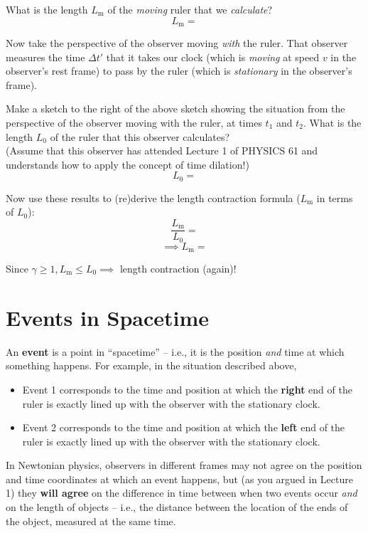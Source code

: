 \documentclass[11pt, letterpaper, openany]{book}
\newenvironment{exercise}[1][Exercise]{%
  \tcolorbox[blanker, breakable, left=1em,
    before skip=1em, after skip=1em,
    borderline west={3pt}{0pt}{PhysNavy},
    colback=PhysCream,
    before upper={\textcolor{PhysNavy}{\sffamily\bfseries #1:}\space}
  ]%
}{%
  \endtcolorbox%
}
\begin{document}
\begin{exercise}[Exercise 9]
What is the length $L_{\text{m}}$ of the \textit{moving} ruler that we \textit{calculate}?
\end{exercise}
\[ L_{\text{m}} = \]

Now take the perspective of the observer moving \textit{with} the ruler. That observer measures the time $\Delta t'$ that it takes our clock (which is \textit{moving} at speed $v$ in the observer's rest frame) to pass by the ruler (which is \textit{stationary} in the observer's frame).

\begin{exercise}[Exercise 10]
Make a sketch to the right of the above sketch showing the situation from the perspective of the observer moving with the ruler, at times $t_1$ and $t_2$. What is the length $L_0$ of the ruler that this observer calculates?\\
(Assume that this observer has attended Lecture 1 of PHYSICS 61 and understands how to apply the concept of time dilation!)
\end{exercise}
\[ L_0 = \]

\begin{exercise}[Exercise 11]
Now use these results to (re)derive the length contraction formula ($L_{\text{m}}$ in terms of $L_0$):
\end{exercise}
\[ \frac{L_{\text{m}}}{L_0} = \]
\[ \implies L_{\text{m}} = \]

Since $\gamma \ge 1, L_{\text{m}} \le L_0 \implies$ length contraction (again)!

\section{Events in Spacetime}

An \textbf{event} is a point in ``spacetime'' -- i.e., it is the position \textit{and} time at which something happens. For example, in the situation described above,
\begin{itemize}
    \item Event 1 corresponds to the time and position at which the \textbf{right} end of the ruler is exactly lined up with the observer with the stationary clock.
    \item Event 2 corresponds to the time and position at which the \textbf{left} end of the ruler is exactly lined up with the observer with the stationary clock.
\end{itemize}

In Newtonian physics, observers in different frames may not agree on the position and time coordinates at which an event happens, but (as you argued in Lecture 1) they \textbf{will agree} on the difference in time between when two events occur \textit{and} on the length of objects -- i.e., the distance between the location of the ends of the object, measured at the same time.
\end{document}
